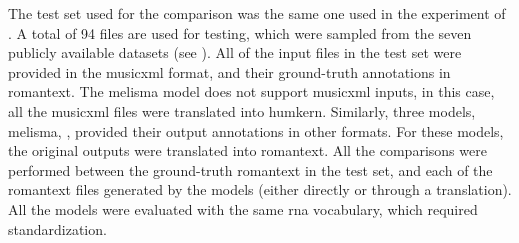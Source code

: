 
The test set used for the comparison was the same one used
in the experiment of
. A total of 94 files
are used for testing, which were sampled from the seven
publicly available datasets (see
). All of the input files
in the test set were provided in the \gls{musicxml} format,
and their ground-truth annotations in \gls{romantext}. The
\gls{melisma} model does not support \gls{musicxml} inputs,
in this case, all the \gls{musicxml} files were translated
into \gls{humkern}. Similarly, three models, \gls{melisma},
\textcite{chen2021attend, mcleod2021modular}, provided their
output annotations in other formats. For these models, the
original outputs were translated into \gls{romantext}. All
the comparisons were performed between the ground-truth
\gls{romantext} in the test set, and each of the
\gls{romantext} files generated by the models (either
directly or through a translation). All the models were
evaluated with the same \gls{rna} vocabulary, which required
standardization.


